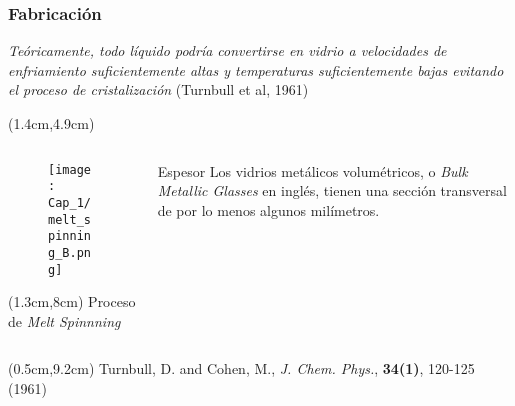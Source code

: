 \begin{frame}
 \frametitle{Fabricación}
 \vspace{-0.15cm}
 \begin{block}{}
    \textit{Te\'oricamente, todo l\'iquido podr\'ia convertirse en vidrio a velocidades de enfriamiento suficientemente altas y temperaturas suficientemente bajas evitando el proceso de cristalizaci\'on} (Turnbull et al, 1961)
 \end{block}
 
 \begin{textblock*}{10cm}(1.4cm,4.9cm)
  \begin{columns}
    \begin{column}{4cm}
      \begin{figure}
	\texttt{[image: Cap\_1/melt\_spinning\_B.png]}
      \end{figure} 
      \begin{textblock*}{4cm}(1.3cm,8cm)
	\scriptsize{Proceso de \textit{Melt Spinnning}}
      \end{textblock*}
    \end{column}
    \begin{column}{6cm}
    \begin{alertblock}{Espesor}
	Los vidrios met\'alicos volum\'etricos, o \textit{Bulk Metallic Glasses} en ingl\'es, tienen una secci\'on transversal de por lo menos algunos mil\'imetros.
    \end{alertblock}
    \end{column}
  \end{columns}
 \end{textblock*}
 \begin{textblock*}{12.6cm}(0.5cm,9.2cm)
  \scriptsize{Turnbull, D. and Cohen, M., \textit{J. Chem. Phys.}, \textbf{34(1)}, 120-125 (1961)}
  \end{textblock*}
\end{frame}

